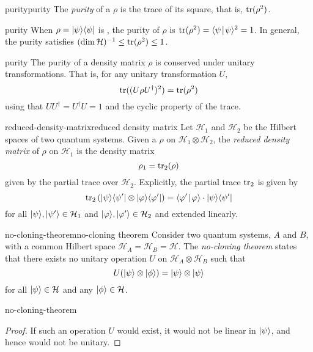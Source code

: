 \begin{topic}{purity}{purity}
    The \emph{purity} of a  $\rho$ is the trace of its square, that is, $\operatorname{tr}(\rho^2)$.
\end{topic}

\begin{example}{purity}
    When $\rho = |\psi\rangle \langle\psi|$ is , the purity of $\rho$ is $\operatorname{tr}(\rho^2) = \langle\psi\!\mid\!\psi\rangle^2 = 1$. In general, the purity satisfies $(\dim \mathcal{H})^{-1} \le \operatorname{tr}(\rho^2) \le 1$.
\end{example}

\begin{example}{purity}
    The purity of a density matrix $\rho$ is conserved under unitary transformations. That is, for any unitary transformation $U$,
    \[ \operatorname{tr}((U \rho U^\dag)^2) = \operatorname{tr}(\rho^2) \]
    using that $UU^\dag = U^\dag U = 1$ and the cyclic property of the trace.
\end{example}

\begin{topic}{reduced-density-matrix}{reduced density matrix}
    Let $\mathcal{H}_1$ and $\mathcal{H}_2$ be the Hilbert spaces of two quantum systems. Given a  $\rho$ on $\mathcal{H}_1 \otimes \mathcal{H}_2$, the \emph{reduced density matrix} of $\rho$ on $\mathcal{H}_1$ is the density matrix
    \[ \rho_1 = \operatorname{tr}_2(\rho) \]
    given by the partial trace over $\mathcal{H}_2$. Explicitly, the partial trace $\operatorname{tr}_2$ is given by
    \[ \operatorname{tr}_2 \left( |\psi\rangle \langle\psi'| \otimes |\varphi\rangle \langle\varphi'| \right) = \langle\varphi'\!\mid\!\varphi\rangle \cdot |\psi\rangle \langle\psi'| \]
    for all $|\psi\rangle, |\psi'\rangle \in \mathcal{H}_1$ and $|\varphi\rangle, |\varphi'\rangle \in \mathcal{H}_2$ and extended linearly.
\end{topic}

\begin{topic}{no-cloning-theorem}{no-cloning theorem}
    Consider two quantum systems, $A$ and $B$, with a common Hilbert space $\mathcal{H}_A = \mathcal{H}_B = \mathcal{H}$. The \emph{no-cloning theorem} states that there exists no unitary operation $U$ on $\mathcal{H}_A \otimes \mathcal{H}_B$ such that
    \[ U (|\psi\rangle \otimes |\phi\rangle) = |\psi\rangle \otimes |\psi\rangle \]
    for all $|\psi\rangle \in \mathcal{H}$ and any $|\phi\rangle \in \mathcal{H}$.
\end{topic}

\begin{example}{no-cloning-theorem}
    \begin{proof}
        If such an operation $U$ would exist, it would not be linear in $|\psi\rangle$, and hence would not be unitary.
    \end{proof}
\end{example}

